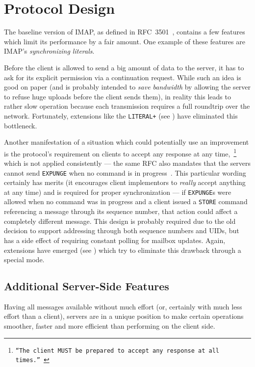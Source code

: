\documentclass[trojita]{subfiles}
\begin{document}
\section{Protocol Design}

The baseline version of IMAP, as defined in RFC~3501~\cite{rfc3501}, contains a few features which limit its performance
by a fair amount.  One example of these features are IMAP's {\em synchronizing literals}.

Before the client is allowed to send a big amount of data to the server, it has to ask for its explicit permission via a
continuation request.  While such an idea is good on paper (and is probably intended to {\em save bandwidth} by allowing
the server to refuse huge uploads before the client sends them), in reality this leads to rather slow operation because
each transmission requires a full roundtrip over the network.  Fortunately, extensions like the {\tt LITERAL+} (see
) have eliminated this bottleneck.

Another manifestation of a situation which could potentially use an improvement is the protocol's requirement on clients
to accept any response at any time,~\footnote{{\tt ``The client MUST be prepared to accept any response at all
times.''}~\cite[p. 61]{rfc3501}} which is not applied consistently --- the same RFC also mandates that the servers
cannot send {\tt EXPUNGE} when no command is in progress~\cite[p. 72]{rfc3501}.  This particular wording certainly has
merits (it encourages client implementors to {\em really} accept anything at any time) and is required for proper
synchronization --- if {\tt EXPUNGE}s were allowed when no command was in progress and a client issued a {\tt STORE}
command referencing a message through its sequence number, that action could affect a completely different message.
This design is probably required due to the old decision to support addressing through both sequence numbers and UIDs,
but has a side effect of requiring constant polling for mailbox updates.  Again, extensions have emerged (see
) which try to eliminate this drawback through a special mode.

\subsection{Additional Server-Side Features}

Having all messages available without much effort (or, certainly with much less effort than a client), servers are in a
unique position to make certain operations smoother, faster and more efficient than performing on the client side.
\end{document}
